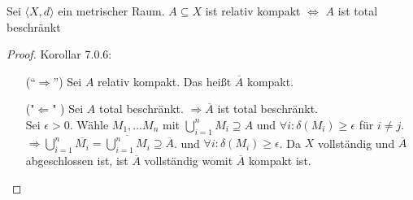 \begin{corollary}{}
    Sei $\langle X, d \rangle$ ein metrischer Raum. 
    $A \subseteq X$ ist relativ kompakt
    $\Leftrightarrow$
    $A$ ist total beschränkt
\end{corollary}

\begin{proof}{Korollar 7.0.6:}\\
    \begin{itemize}
        \item[(“$\Rightarrow$”)] Sei $A$ relativ kompakt. 
        Das heißt $\overline{A}$ kompakt. 
        \item[("$\Leftarrow$" )] Sei $A$ total beschränkt.
        $\Rightarrow \overline{A}$ ist total beschränkt.\\
        Sei $\epsilon > 0$. Wähle $M_1,\dots M_n$ 
        mit $\bigcup_{i=1}^n M_i \supseteq A$ und
        $\forall i: \delta(M_i) \geq \epsilon$ für $i \neq j$.
        $\Rightarrow \bigcup_{i=1}^n \overline{M_i} 
        = \overline{\bigcup_{i=1}^n M_i} \supseteq \overline{A}$.
        und $\forall i : \delta(M_i) \geq \epsilon$.
        Da $X$ vollständig und $\overline{A}$ abgeschlossen ist, ist
        $\overline{A}$ vollständig womit $\overline{A}$ kompakt ist.
    \end{itemize}
    
\end{proof}
